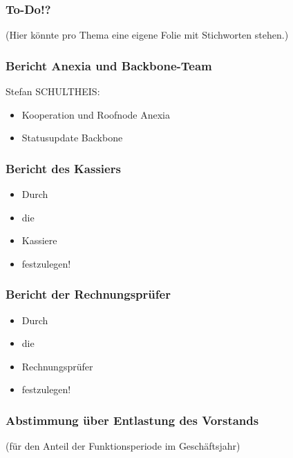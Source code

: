 \documentclass[17pt]{beamer}
\begin{document}
\begin{frame}
	\frametitle{To-Do!?}
	(Hier könnte pro Thema eine eigene Folie mit Stichworten stehen.)
\end{frame}



\begin{frame}
	\frametitle{Bericht Anexia und Backbone-Team}
	Stefan SCHULTHEIS:
	\begin{itemize}
		\item Kooperation und Roofnode Anexia
		\item Statusupdate Backbone
	\end{itemize}
\end{frame}



\begin{frame}
	\frametitle{Bericht des Kassiers}
	\begin{itemize}
		\item Durch
		\item die
		\item Kassiere
		\item festzulegen!
	\end{itemize}
\end{frame}



\begin{frame}
	\frametitle{Bericht der Rechnungsprüfer}
	\begin{itemize}
		\item Durch
		\item die
		\item Rechnungsprüfer
		\item festzulegen!
	\end{itemize}
\end{frame}



\begin{frame}
	\frametitle{Abstimmung über Entlastung des Vorstands}
	(für den Anteil der Funktionsperiode im Geschäftsjahr)
\end{frame}
\end{document}

